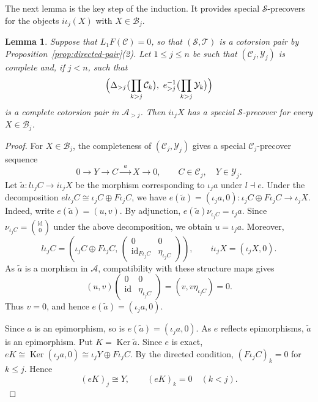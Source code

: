 \documentclass[11pt]{amsart}
\newtheorem{lemma}[theorem]{Lemma}
\theoremstyle{definition}
\theoremstyle{remark}
\theoremstyle{plain}
\numberwithin{equation}{section}
\begin{document}
The next lemma is the key step of the induction. It provides special
$\mathcal{S}$-precovers for the objects $i\iota_j(X)$ with $X\in\mathcal{B}_j$.

\begin{lemma}\label{lem:vertex-precover}
	Suppose that $L_1F(\mathcal{C})=0$, so that $(\mathcal{S},\mathcal{T})$ is a cotorsion pair
	by Proposition~\ref{prop:directed-pair}(2). Let $1\leq j\leq n$ be such
	that $(\mathcal{C}_j,\mathcal{Y}_j)$ is complete and, if $j<n$, such that
	\[
	\Bigl(\Delta_{>j}\bigl(\prod_{k>j}\mathcal{C}_k\bigr),\
	e_{>j}^{-1}\bigl(\prod_{k>j}\mathcal{Y}_k\bigr)\Bigr)
	\]
	is a complete cotorsion pair in $\mathcal{A}_{>j}$. Then $i\iota_jX$ has a
	special $\mathcal{S}$-precover for every $X\in\mathcal{B}_j$.
\end{lemma}

\begin{proof}
	For $X\in\mathcal{B}_j$, the completeness of
	$(\mathcal{C}_j,\mathcal{Y}_j)$ gives a special
	$\mathcal{C}_j$-precover sequence
	\[
	0\longrightarrow Y\longrightarrow C
	\xrightarrow{\;\;a\;\;}X\longrightarrow0,
	\qquad C\in\mathcal{C}_j,\quad Y\in\mathcal{Y}_j.
	\]
	Let $\widetilde a:l\iota_jC\to i\iota_jX$ be the morphism corresponding to $\iota_ja$ under $l\dashv e$. Under the decomposition
	$el\iota_jC\cong\iota_jC\oplus F\iota_jC$, we have $e(\widetilde a)=(\iota_ja,0): \iota_jC \oplus F\iota_jC \longrightarrow \iota_jX$.
	Indeed, write $e(\widetilde a)=(u,v)$.
	By adjunction, $e(\widetilde a)\nu_{\iota_jC}=\iota_ja$. Since $\nu_{\iota_jC}=\binom{\mathrm{id}}{0}$ under the above
	decomposition, we obtain $u=\iota_ja$.
	Moreover,
	\[
	l\iota_jC=
	\left(
	\iota_jC\oplus F\iota_jC,\,
	\begin{pmatrix}
		0&0\\
		\mathrm{id}_{F\iota_jC}&\eta_{\iota_jC}
	\end{pmatrix}
	\right),
	\qquad
	i\iota_jX=(\iota_jX,0).
	\]
	As $\widetilde a$ is a morphism in $\mathcal{A}$,
	compatibility with these structure maps gives
	\[
	(u,v)
	\begin{pmatrix}
		0&0\\
		\mathrm{id}&\eta_{\iota_jC}
	\end{pmatrix}
	=(v,v\eta_{\iota_jC})=0.
	\]
	Thus $v=0$, and hence $e(\widetilde a)=(\iota_ja,0)$.

	Since $a$ is an epimorphism, so is
	$e(\widetilde a)=(\iota_ja,0)$.
	As $e$ reflects epimorphisms, $\widetilde a$ is an epimorphism. Put $K=\operatorname{Ker}\widetilde a$. Since $e$ is exact, $eK\cong\operatorname{Ker}(\iota_ja,0)
	\cong\iota_jY\oplus F\iota_jC$.
	By the directed condition, $(F\iota_jC)_k=0$ for $k\leq j$.
	Hence
	\[
	(eK)_j\cong Y,\qquad (eK)_k=0\quad(k<j).
	\]


\end{proof}
\end{document}
